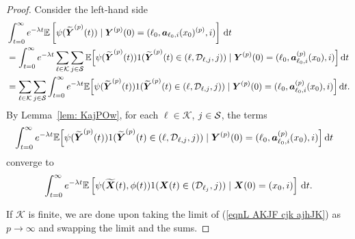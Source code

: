\begin{proof}
	Consider the left-hand side 
	\begin{align}
		&\int_{t=0}^\infty e^{-\lambda t}\mathbb E\left[\psi(\widetilde{\boldsymbol Y}^{(p)}(t))  \mid \boldsymbol Y^{(p)}(0)=(\ell_0, \boldsymbol  a_{\ell_0,i}(x_0)^{(p)},i) \right] \, \mathrm{d} t \nonumber 
		\\&= \int_{t=0}^\infty e^{-\lambda t}\sum_{\ell\in\mathcal K}\sum_{j\in\mathcal S}\mathbb E\Big[\psi(\widetilde{\boldsymbol Y}^{(p)}(t)) 1(\widetilde{\boldsymbol Y}^{(p)}(t)\in(\ell,\mathcal D_{\ell,j},j))  \mid\boldsymbol Y^{(p)}(0)=(\ell_0, \boldsymbol  a_{\ell_0,i}^{(p)}(x_0), i) \Big] \, \mathrm{d} t \nonumber 
		\\&= \sum_{\ell\in\mathcal K}\sum_{j\in\mathcal S}\int_{t=0}^\infty e^{-\lambda t}\mathbb E\Big[\psi(\widetilde{\boldsymbol Y}^{(p)}(t)) 1(\widetilde{\boldsymbol Y}^{(p)}(t)\in(\ell,\mathcal D_{\ell,j},j))\mid  \boldsymbol Y^{(p)}(0)=(\ell_0,  \boldsymbol  a_{\ell_0,i}^{(p)}(x_0),  i) \Big] \, \mathrm{d} t. \label{eqnL AKJF cjk ajhJK}
	\end{align}
	By Lemma~\ref{lem: KajPOw}, for each \(\ell\in\mathcal K\), \(j\in\mathcal{S}\), the terms 
	 \begin{align}
	 	&\int_{t=0}^\infty e^{-\lambda t}\mathbb E\Big[\psi(\widetilde{\boldsymbol Y}^{(p)}(t)) 1(\widetilde{\boldsymbol Y}^{(p)}(t)\in (\ell, \mathcal D_{\ell,j},j))  \mid \boldsymbol Y^{(p)}(0)=(\ell_0, \boldsymbol  a_{\ell_0,i}^{(p)}(x_0),i) \Big] \, \mathrm{d} t
	\end{align}
		converge to 
	\[\int_{t=0}^\infty e^{-\lambda t}  \mathbb E\left[\psi(\widetilde{\boldsymbol X}(t),\phi(t))1(\boldsymbol X(t)\in(\mathcal D_{\ell_j},j))\mid \boldsymbol X(0)=(x_0,i) \right] \, \mathrm{d} t.\]
	
	If \(\mathcal K\) is finite, we are done upon taking the limit of (\ref{eqnL AKJF cjk ajhJK}) as \(p\to\infty\) and swapping the limit and the sums. 
	

\end{proof}
